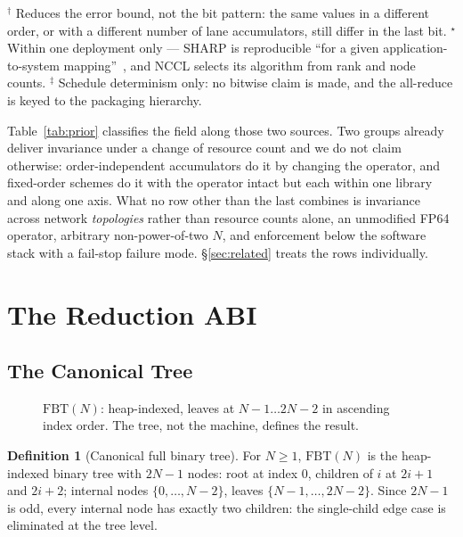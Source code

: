 \documentclass[journal,10pt]{IEEEtran}
\theoremstyle{plain}
\theoremstyle{definition}
\newtheorem{definition}{Definition}
\theoremstyle{remark}
\newcommand{\FBT}{\ensuremath{\mathrm{FBT}}}
\begin{document}
\begin{table}[!t]
\footnotesize
$^{\dagger}$ Reduces the error bound, not the bit pattern: the same values in a
different order, or with a different number of lane accumulators, still differ
in the last bit.
$^{\star}$ Within one deployment only --- SHARP is reproducible ``for a given
application-to-system mapping''~\cite{mellanox2019aggregation}, and NCCL
selects its algorithm from rank and node counts.
$^{\ddagger}$ Schedule determinism only: no bitwise claim is made, and the
all-reduce is keyed to the packaging hierarchy.
\end{table}

Table~\ref{tab:prior} classifies the field along those two sources. Two
groups already deliver invariance under a change of resource count and we do
not claim otherwise: order-independent accumulators do it by changing the
operator, and fixed-order schemes do it with the operator intact but each
within one library and along one axis. What no row other than the last
combines is invariance across network \emph{topologies} rather than resource
counts alone, an unmodified FP64 operator, arbitrary non-power-of-two $N$,
and enforcement below the software stack with a fail-stop failure mode.
\S\ref{sec:related} treats the rows individually.


\section{The Reduction ABI}\label{sec:abi}

\subsection{The Canonical Tree}\label{sec:abi-tree}

\begin{figure}[!t]\centering

\caption{$\FBT(N)$: heap-indexed, leaves at $N{-}1 \ldots 2N{-}2$ in ascending index order. The tree, not the machine, defines the result.}\label{fig:canontree}
\end{figure}


\begin{definition}[Canonical full binary tree]\label{def:fbt}
For $N \geq 1$, $\FBT(N)$ is the heap-indexed binary tree with $2N-1$ nodes:
root at index $0$, children of $i$ at $2i+1$ and $2i+2$; internal nodes
$\{0,\ldots,N-2\}$, leaves $\{N-1,\ldots,2N-2\}$. Since $2N-1$ is odd, every
internal node has exactly two children: the single-child edge case is
eliminated at the tree level.
\end{definition}
\end{document}
